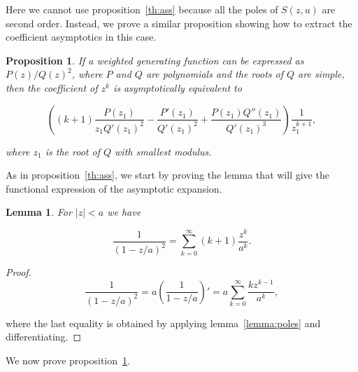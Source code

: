 \documentclass{article}
\newtheorem{lemma}{Lemma}
\newtheorem{proposition}{Proposition}
\begin{document}
Here we cannot use proposition~\ref{th:ass} because all the poles of
$S(z,u)$ are second order. Instead, we prove a similar proposition showing
how to extract the coefficient asymptotics in this case.

\begin{proposition}
\label{th:ass2}
If a weighted generating function can be expressed as $P(z)/Q(z)^2$, where
$P$ and $Q$ are polynomials and the roots of $Q$ are simple, then the
coefficient of $z^k$ is asymptotically equivalent to

\begin{equation}
\label{eq:ass2}
\left( (k+1)\frac{P(z_1)}{z_1 Q'(z_1)^2} - \frac{P'(z_1)}{Q'(z_1)^2} +
\frac{P(z_1)Q''(z_1)}{Q'(z_1)^3} \right)
\frac{1}{z_1^{k+1}},
\end{equation}

\noindent
where $z_1$ is the root of $Q$ with smallest \textit{modulus}.
\end{proposition}

As in proposition~\ref{th:ass}, we start by proving the lemma that will
give the functional expression of the asymptotic expansion.

\begin{lemma}
\label{lemma:poles2}
For $|z| < a$ we have

\begin{equation}
\label{eq:poles2}
\frac{1}{(1-z/a)^2} = \sum_{k=0}^\infty (k+1)\frac{z^k}{a^k}.
\end{equation}
\end{lemma}

\begin{proof}
\begin{equation*}
\frac{1}{(1-z/a)^2} = a \left( \frac{1}{1-z/a} \right)'
= a \sum_{k=0}^\infty \frac{kz^{k-1}}{a^k},
\end{equation*}

\noindent
where the last equality is obtained by applying lemma~\ref{lemma:poles}
and differentiating.
\end{proof}

We now prove proposition~\ref{th:ass2}.
\end{document}

